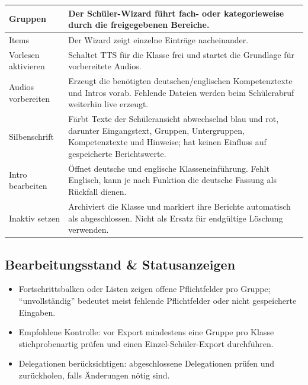 \documentclass[12pt,a4paper]{article}
\begin{document}
\begin{tabularx}{\textwidth}{|p{}|X|}
\hline
Gruppen & Der Schüler-Wizard führt fach- oder kategorieweise durch die freigegebenen Bereiche.\\
\hline
Items & Der Wizard zeigt einzelne Einträge nacheinander.\\
\hline
Vorlesen aktivieren & Schaltet TTS für die Klasse frei und startet die Grundlage für vorbereitete Audios.\\
\hline
Audios vorbereiten & Erzeugt die benötigten deutschen/englischen Kompetenztexte und Intros vorab. Fehlende Dateien werden beim Schülerabruf weiterhin live erzeugt.\\
\hline
Silbenschrift & Färbt Texte der Schüleransicht abwechselnd blau und rot, darunter Eingangstext, Gruppen, Untergruppen, Kompetenztexte und Hinweise; hat keinen Einfluss auf gespeicherte Berichtswerte.\\
\hline
Intro bearbeiten & Öffnet deutsche und englische Klasseneinführung. Fehlt Englisch, kann je nach Funktion die deutsche Fassung als Rückfall dienen.\\
\hline
Inaktiv setzen & Archiviert die Klasse und markiert ihre Berichte automatisch als abgeschlossen. Nicht als Ersatz für endgültige Löschung verwenden.\\
\hline
\end{tabularx}

\subsection*{Bearbeitungsstand \& Statusanzeigen}
\begin{itemize}
  \item Fortschrittsbalken oder Listen zeigen offene Pflichtfelder pro Gruppe; \enquote{unvollständig} bedeutet meist fehlende Pflichtfelder oder nicht gespeicherte Eingaben.
  \item Empfohlene Kontrolle: vor Export mindestens eine Gruppe pro Klasse stichprobenartig prüfen und einen Einzel-Schüler-Export durchführen.
  \item Delegationen berücksichtigen: abgeschlossene Delegationen prüfen und zurückholen, falls Änderungen nötig sind.
\end{itemize}
\end{document}
